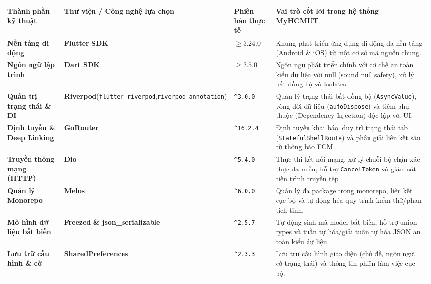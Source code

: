 \begin{table}[H]
    \centering
    \small
    \renewcommand{\arraystretch}{1.25}
    \begin{tabularx}{\textwidth}{|L{2.8cm}|L{3.4cm}|L{1.8cm}|Y|}
    \hline
    \textbf{Thành phần kỹ thuật} & \textbf{Thư viện / Công nghệ lựa chọn} & \textbf{Phiên bản thực tế} & \textbf{Vai trò cốt lõi trong hệ thống MyHCMUT} \\
    \hline
    \textbf{Nền tảng di động} & \textbf{Flutter SDK} \cite{flutter_doc} & $\ge 3.24.0$ & Khung phát triển ứng dụng di động đa nền tảng (Android \& iOS) từ một cơ sở mã nguồn chung. \\
    \hline
    \textbf{Ngôn ngữ lập trình} & \textbf{Dart SDK} \cite{dart_doc} & $\ge 3.5.0$ & Ngôn ngữ phát triển chính với cơ chế an toàn kiểu dữ liệu với null (sound null safety), xử lý bất đồng bộ và Isolates. \\
    \hline
    \textbf{Quản trị trạng thái \& DI} & \textbf{Riverpod}\newline (\texttt{flutter\_\allowbreak riverpod},\newline \texttt{riverpod\_\allowbreak annotation}) \cite{riverpod_doc} & \texttt{\textasciicircum 3.0.0} & Quản lý trạng thái bất đồng bộ (\texttt{AsyncValue}), vòng đời dữ liệu (\texttt{autoDispose}) và tiêm phụ thuộc (Dependency Injection) độc lập với UI. \\
    \hline
    \textbf{Định tuyến \& Deep Linking} & \textbf{GoRouter} \cite{gorouter_doc} & \texttt{\textasciicircum 16.2.4} & Định tuyến khai báo, duy trì trạng thái tab (\texttt{Stateful\allowbreak ShellRoute}) và phân giải liên kết sâu từ thông báo FCM. \\
    \hline
    \textbf{Truyền thông mạng (HTTP)} & \textbf{Dio} \cite{dio_doc} & \texttt{\textasciicircum 5.4.0} & Thực thi kết nối mạng, xử lý chuỗi bộ chặn xác thực đa miền, hỗ trợ \texttt{CancelToken} và giám sát tiến trình truyền tệp. \\
    \hline
    \textbf{Quản lý Monorepo} & \textbf{Melos} \cite{melos_doc} & \texttt{\textasciicircum 6.0.0} & Quản lý đa package trong monorepo, liên kết cục bộ và tự động hóa quy trình kiểm thử/phân tích tĩnh. \\
    \hline
    \textbf{Mô hình dữ liệu bất biến} & \textbf{Freezed \& json\_serializable} \cite{freezed_doc} & \texttt{\textasciicircum 2.5.7} & Tự động sinh mã model bất biến, hỗ trợ union types và tuần tự hóa/giải tuần tự hóa JSON an toàn kiểu dữ liệu. \\
    \hline
    \textbf{Lưu trữ cấu hình \& cờ} & \textbf{SharedPreferences} & \texttt{\textasciicircum 2.3.3} & Lưu trữ cấu hình giao diện (chủ đề, ngôn ngữ, cờ trạng thái) và thông tin phiên làm việc cục bộ. \\

\end{tabularx}
\end{table}
